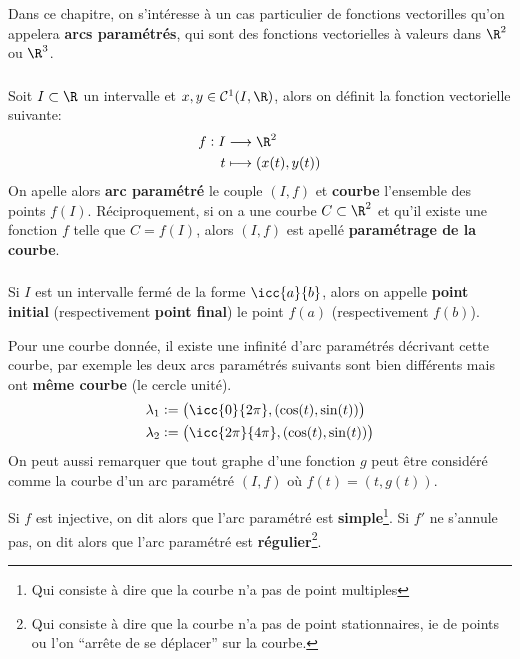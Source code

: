 \chapter*{} %

Dans ce chapitre, on s'intéresse à un cas particulier de fonctions vectorilles qu'on appelera \textbf{arcs paramétrés}, qui sont des fonctions vectorielles à valeurs dans \(\R^2\) ou \(\R^3\).

\subsection*{}
Soit \(I \subset \R\) un intervalle et \(x, y \in \mathcal{C}^1(I, \R)\), alors on définit la fonction vectorielle suivante:
\[
   \begin{aligned}
      f: I &\longrightarrow \R^2\\
      t &\longmapsto (x(t), y(t))
   \end{aligned}
\]
On apelle alors \textbf{arc paramétré} le couple \((I, f)\) et \textbf{courbe} l'ensemble des points \(f(I)\). Réciproquement, si on a une courbe \(C \subset \R^2\) et qu'il existe une fonction \(f\) telle que \(C = f(I)\), alors \((I, f)\) est apellé \textbf{paramétrage de la courbe}.\<

\subsection*{}
Si \(I\) est un intervalle fermé de la forme \(\icc{a}{b}\), alors on appelle \textbf{point initial} (respectivement \textbf{point final}) le point \(f(a)\) (respectivement \(f(b)\)).\<

Pour une courbe donnée, il existe une infinité d'arc paramétrés décrivant cette courbe, par exemple les deux arcs paramétrés suivants sont bien différents mais ont \textbf{même courbe} (le cercle unité).
\begin{align*}
   \lambda_1 &:= \bigl(\icc{0}{2\pi}, (\cos(t), \sin(t))\bigl) \\
   \lambda_2 &:= \bigl(\icc{2\pi}{4\pi}, (\cos(t), \sin(t))\bigl)
\end{align*}
On peut aussi remarquer que tout graphe d'une fonction \(g\) peut être considéré comme la courbe d'un arc paramétré \((I, f)\) où \(f(t) = (t, g(t))\). \<

Si \(f\) est injective, on dit alors que l'arc paramétré est \textbf{simple}\footnote[1]{Qui consiste à dire que la courbe n'a pas de point multiples}. \+
Si \(f'\) ne s'annule pas, on dit alors que l'arc paramétré est \textbf{régulier}\footnote[2]{Qui consiste à dire que la courbe n'a pas de point stationnaires, ie de points ou l'on ``arrête de se déplacer'' sur la courbe.}. \+


